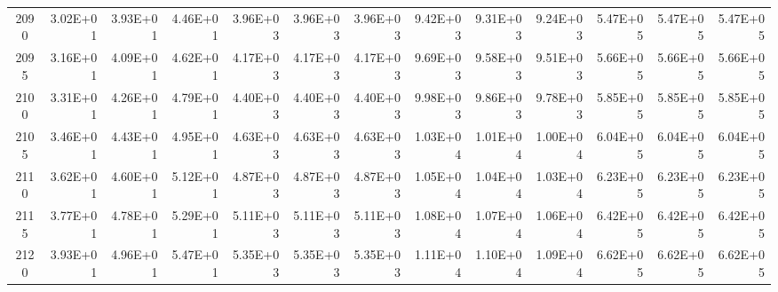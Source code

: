 \documentclass{article}
\begin{document}
\begin{table}
\begin{tabular}{crrr|rrr|rrr|rrr}
2090     & 3.02E+01 & 3.93E+01 & 4.46E+01 & 3.96E+03 & 3.96E+03 & 3.96E+03 & 9.42E+03 & 9.31E+03 & 9.24E+03 & 5.47E+05 & 5.47E+05 & 5.47E+05 \\
2095     & 3.16E+01 & 4.09E+01 & 4.62E+01 & 4.17E+03 & 4.17E+03 & 4.17E+03 & 9.69E+03 & 9.58E+03 & 9.51E+03 & 5.66E+05 & 5.66E+05 & 5.66E+05 \\
2100     & 3.31E+01 & 4.26E+01 & 4.79E+01 & 4.40E+03 & 4.40E+03 & 4.40E+03 & 9.98E+03 & 9.86E+03 & 9.78E+03 & 5.85E+05 & 5.85E+05 & 5.85E+05 \\
2105     & 3.46E+01 & 4.43E+01 & 4.95E+01 & 4.63E+03 & 4.63E+03 & 4.63E+03 & 1.03E+04 & 1.01E+04 & 1.00E+04 & 6.04E+05 & 6.04E+05 & 6.04E+05 \\
2110     & 3.62E+01 & 4.60E+01 & 5.12E+01 & 4.87E+03 & 4.87E+03 & 4.87E+03 & 1.05E+04 & 1.04E+04 & 1.03E+04 & 6.23E+05 & 6.23E+05 & 6.23E+05 \\
2115     & 3.77E+01 & 4.78E+01 & 5.29E+01 & 5.11E+03 & 5.11E+03 & 5.11E+03 & 1.08E+04 & 1.07E+04 & 1.06E+04 & 6.42E+05 & 6.42E+05 & 6.42E+05 \\
2120     & 3.93E+01 & 4.96E+01 & 5.47E+01 & 5.35E+03 & 5.35E+03 & 5.35E+03 & 1.11E+04 & 1.10E+04 & 1.09E+04 & 6.62E+05 & 6.62E+05 & 6.62E+05
\end{tabular}
\end{table}
\end{document}
